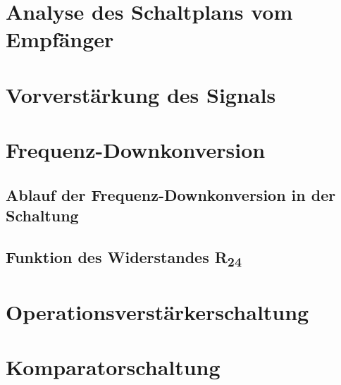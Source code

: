 \section{Analyse des Schaltplans vom Empfänger} %

\section{Vorverstärkung des Signals} %

\section{Frequenz-Downkonversion} %
\subsection{Ablauf der Frequenz-Downkonversion in der Schaltung}
\subsection{Funktion des Widerstandes R\textsubscript{24}}

\section{Operationsverstärkerschaltung} %

\section{Komparatorschaltung} %
\clearpage